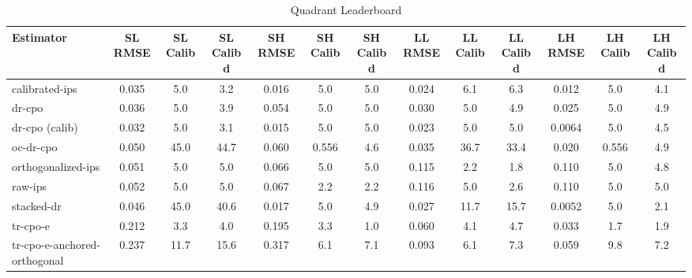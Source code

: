 \begin{table}[htbp]
\centering
\caption{Quadrant Leaderboard}
\label{tab:A1}
\begin{tabular}{l|cccccccccccc}
\toprule
Estimator & SL RMSE & SL Calib & SL Calib d & SH RMSE & SH Calib & SH Calib d & LL RMSE & LL Calib & LL Calib d & LH RMSE & LH Calib & LH Calib d \\
\midrule
calibrated-ips & 0.035 & 5.0 & 3.2 & 0.016 & 5.0 & 5.0 & 0.024 & 6.1 & 6.3 & 0.012 & 5.0 & 4.1 \\
dr-cpo & 0.036 & 5.0 & 3.9 & 0.054 & 5.0 & 5.0 & 0.030 & 5.0 & 4.9 & 0.025 & 5.0 & 4.9 \\
dr-cpo (calib) & 0.032 & 5.0 & 3.1 & 0.015 & 5.0 & 5.0 & 0.023 & 5.0 & 5.0 & 0.0064 & 5.0 & 4.5 \\
oc-dr-cpo & 0.050 & 45.0 & 44.7 & 0.060 & 0.556 & 4.6 & 0.035 & 36.7 & 33.4 & 0.020 & 0.556 & 4.9 \\
orthogonalized-ips & 0.051 & 5.0 & 5.0 & 0.066 & 5.0 & 5.0 & 0.115 & 2.2 & 1.8 & 0.110 & 5.0 & 4.8 \\
raw-ips & 0.052 & 5.0 & 5.0 & 0.067 & 2.2 & 2.2 & 0.116 & 5.0 & 2.6 & 0.110 & 5.0 & 5.0 \\
stacked-dr & 0.046 & 45.0 & 40.6 & 0.017 & 5.0 & 4.9 & 0.027 & 11.7 & 15.7 & 0.0052 & 5.0 & 2.1 \\
tr-cpo-e & 0.212 & 3.3 & 4.0 & 0.195 & 3.3 & 1.0 & 0.060 & 4.1 & 4.7 & 0.033 & 1.7 & 1.9 \\
tr-cpo-e-anchored-orthogonal & 0.237 & 11.7 & 15.6 & 0.317 & 6.1 & 7.1 & 0.093 & 6.1 & 7.3 & 0.059 & 9.8 & 7.2 \\
\bottomrule
\end{tabular}
\end{table}